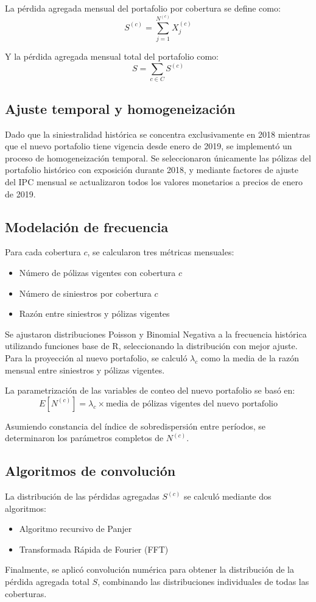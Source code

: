 La pérdida agregada mensual del portafolio por cobertura se define como:
$$S^{(c)} = \sum_{j=1}^{N^{(c)}} X_j^{(c)}$$

Y la pérdida agregada mensual total del portafolio como:
$$S = \sum_{c \in C} S^{(c)}$$

\subsection{Ajuste temporal y homogeneización}

Dado que la siniestralidad histórica se concentra exclusivamente en 2018 mientras que el nuevo portafolio tiene vigencia desde enero de 2019, se implementó un proceso de homogeneización temporal. Se seleccionaron únicamente las pólizas del portafolio histórico con exposición durante 2018, y mediante factores de ajuste del IPC mensual se actualizaron todos los valores monetarios a precios de enero de 2019.

\subsection{Modelación de frecuencia}

Para cada cobertura $c$, se calcularon tres métricas mensuales:
\begin{itemize}
\item Número de pólizas vigentes con cobertura $c$
\item Número de siniestros por cobertura $c$
\item Razón entre siniestros y pólizas vigentes
\end{itemize}

Se ajustaron distribuciones Poisson y Binomial Negativa a la frecuencia histórica utilizando funciones base de R, seleccionando la distribución con mejor ajuste. Para la proyección al nuevo portafolio, se calculó $\lambda_c$ como la media de la razón mensual entre siniestros y pólizas vigentes.

La parametrización de las variables de conteo del nuevo portafolio se basó en:
$$E[N^{(c)}] = \lambda_c \times \text{media de pólizas vigentes del nuevo portafolio}$$

Asumiendo constancia del índice de sobredispersión entre períodos, se determinaron los parámetros completos de $N^{(c)}$.

\subsection{Algoritmos de convolución}

La distribución de las pérdidas agregadas $S^{(c)}$ se calculó mediante dos algoritmos:
\begin{itemize}
\item Algoritmo recursivo de Panjer
\item Transformada Rápida de Fourier (FFT)
\end{itemize}

Finalmente, se aplicó convolución numérica para obtener la distribución de la pérdida agregada total $S$, combinando las distribuciones individuales de todas las coberturas.